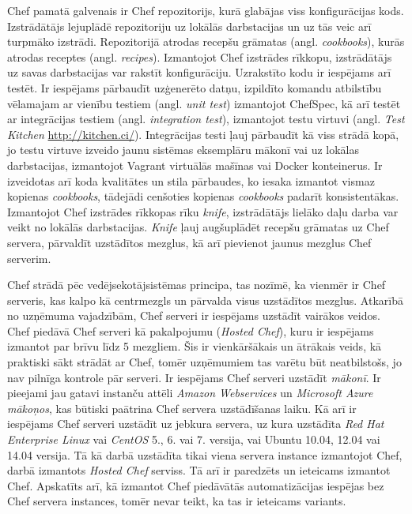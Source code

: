 Chef pamatā galvenais ir Chef repozitorijs, kurā glabājas viss konfigurācijas kods. Izstrādātājs lejuplādē repozitoriju uz lokālās darbstacijas un uz tās veic arī turpmāko izstrādi. Repozitorijā atrodas recepšu grāmatas (angl. \textit{cookbooks}), kurās atrodas receptes (angl. \textit{recipes}).
Izmantojot Chef izstrādes rīkkopu, izstrādātājs uz savas darbstacijas var rakstīt konfigurāciju.
Uzrakstīto kodu ir iespējams arī testēt. Ir iespējams pārbaudīt uzģenerēto datņu, izpildīto komandu atbilstību vēlamajam ar vienību testiem (angl. \textit{unit test}) izmantojot ChefSpec, kā arī testēt ar integrācijas testiem (angl. \textit{integration test}), izmantojot testu virtuvi (angl. \textit{Test Kitchen} \url{http://kitchen.ci/}). Integrācijas testi ļauj pārbaudīt kā viss strādā kopā, jo testu virtuve izveido jaunu sistēmas eksemplāru mākonī vai uz lokālas darbstacijas, izmantojot Vagrant virtuālās mašīnas vai Docker konteinerus. Ir izveidotas arī koda kvalitātes un stila pārbaudes, ko iesaka izmantot vismaz kopienas \textit{cookbooks}, tādejādi cenšoties kopienas \textit{cookbooks} padarīt konsistentākas.
Izmantojot Chef izstrādes rīkkopas rīku \textit{knife}, izstrādātājs lielāko daļu darba var veikt no lokālās darbstacijas. \textit{Knife} ļauj augšuplādēt recepšu grāmatas uz Chef servera, pārvaldīt uzstādītos mezglus, kā arī pievienot jaunus mezglus Chef serverim.

Chef strādā pēc vedējsekotājsistēmas principa, tas nozīmē, ka vienmēr ir Chef serveris, kas kalpo kā centrmezgls un pārvalda visus uzstādītos mezglus. Atkarībā no uzņēmuma vajadzībām, Chef serveri ir iespējams uzstādīt vairākos veidos. Chef piedāvā Chef serveri kā pakalpojumu (\textit{Hosted Chef}), kuru ir iespējams izmantot par brīvu līdz 5 mezgliem. Šis ir vienkāršākais un ātrākais veids, kā praktiski sākt strādāt ar Chef, tomēr uzņēmumiem tas varētu būt neatbilstošs, jo nav pilnīga kontrole pār serveri. Ir iespējams Chef serveri uzstādīt \textit{mākonī}. Ir pieejami jau gatavi instanču attēli \textit{Amazon Webservices} un \textit{Microsoft Azure} \textit{mākoņos}, kas būtiski paātrina Chef servera uzstādīšanas laiku. Kā arī ir iespējams Chef serveri uzstādīt uz jebkura servera, uz kura uzstādīta \textit{Red Hat Enterprise Linux} vai \textit{CentOS} 5., 6. vai 7. versija, vai Ubuntu 10.04, 12.04 vai 14.04 versija.
Tā kā darbā uzstādīta tikai viena servera instance izmantojot Chef, darbā izmantots \textit{Hosted Chef} serviss. Tā arī ir paredzēts un ieteicams izmantot Chef. Apskatīts arī, kā izmantot Chef piedāvātās automatizācijas iespējas bez Chef servera instances, tomēr nevar teikt, ka tas ir ieteicams variants.

